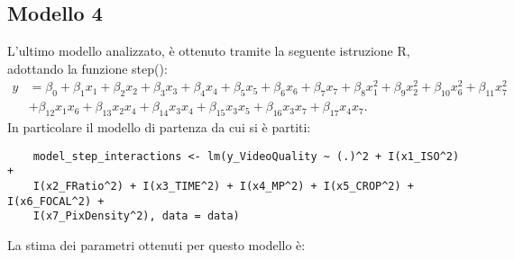\subsection{Modello 4}
L'ultimo modello analizzato, è ottenuto tramite la seguente istruzione R, adottando la funzione step():
\begin{align*}
	y &= \beta_0 
	+ \beta_1 x_1 + \beta_2 x_2 + \beta_3 x_3 + \beta_4 x_4 + \beta_5 x_5 
	+ \beta_6 x_6 + \beta_7 x_7 
	+ \beta_8 x_1^2 + \beta_9 x_2^2 + \beta_{10} x_6^2 + \beta_{11} x_7^2 \\
	&+ \beta_{12} x_1 x_6 + \beta_{13} x_2 x_4 + \beta_{14} x_3 x_4 
	+ \beta_{15} x_3 x_5 + \beta_{16} x_3 x_7 
	+ \beta_{17} x_4 x_7.
\end{align*}
In particolare il modello di partenza da cui si è partiti:
\begin{verbatim}
	model_step_interactions <- lm(y_VideoQuality ~ (.)^2 + I(x1_ISO^2) + 
	I(x2_FRatio^2) + I(x3_TIME^2) + I(x4_MP^2) + I(x5_CROP^2) + I(x6_FOCAL^2) + 
	I(x7_PixDensity^2), data = data)
\end{verbatim}
La stima dei parametri ottenuti per questo modello è:
